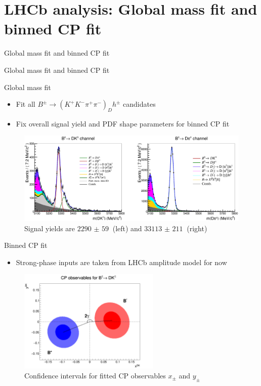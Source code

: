 \documentclass{beamer}
\begin{document}
\section{LHCb analysis: Global mass fit and binned CP fit}
\begin{frame}{Global mass fit and binned CP fit}
  \begin{center}
    {\huge Global mass fit and binned CP fit} \\
  \end{center}
\end{frame}

\begin{frame}{Global mass fit}
  \begin{itemize}
    \setlength\itemsep{1.3em}
    \item{Fit all $B^\pm\to(K^+K^-\pi^+\pi^-)_Dh^\pm$ candidates}
    \item{Fix overall signal yield and PDF shape parameters for binned CP fit}
  \end{itemize}
  \begin{figure}
    \centering
    \includegraphics[width = 1.0\textwidth]{../Report/Plots/GlobalFit.png}
    \caption{Signal yields are $\SI{2290(59)}{}$ (left) and $\SI{33113(211)}{}$ (right)}
  \end{figure}
\end{frame}

\begin{frame}{Binned CP fit}
  \begin{itemize}
    \setlength\itemsep{1.0em}
    \item{Strong-phase inputs are taken from LHCb amplitude model for now}
  \end{itemize}
  \begin{figure}
    \centering
    \includegraphics[width = 0.6\textwidth]{../Report/Plots/CPContours.png}
    \caption{Confidence intervals for fitted CP observables $x_\pm$ and $y_\pm$}
  \end{figure}
\end{frame}
\end{document}
